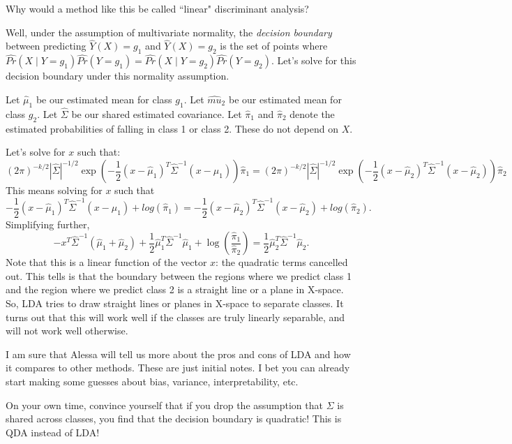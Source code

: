 Why would a method like this be called ``linear" discriminant analysis? 

Well, under the assumption of multivariate normality, the \emph{decision boundary} between predicting $\hat{Y}(X) = g_1$ and $\hat{Y}(X) = g_2$ is the set of points where  $\widehat{Pr}(X \mid Y=g_1)\widehat{Pr}(Y=g_1)=\widehat{Pr}(X \mid Y=g_2)\widehat{Pr}(Y=g_2)$. Let's solve for this decision boundary under this normality assumption. 

Let $\hat{\mu}_1$ be our estimated mean for class $g_1$. Let $\hat{mu}_2$ be our estimated mean for class $g_2$. Let $\hat{\Sigma}$ be our shared estimated covariance. Let $\hat{\pi}_1$ and $\hat{\pi}_2$ denote the estimated probabilities of falling in class 1 or class 2. These do not depend on $X$. 

 Let's solve for $x$ such that:
$$
(2\pi)^{-k/2}|\hat{\Sigma}|^{-1/2} \exp\left( -\frac{1}{2} (x - \hat{\mu}_1)^T  \hat{\Sigma}^{-1}(x - \hat{\mu}_1)\right) \hat{\pi}_1= (2\pi)^{-k/2}|\hat{\Sigma}|^{-1/2} \exp\left( -\frac{1}{2} (x - \hat{\mu}_2)^T  \hat{\Sigma}^{-1}(x - \hat{\mu}_2)\right) \hat{\pi}_2
$$ 
This means solving for $x$ such that 
$$
-\frac{1}{2} (x - \hat{\mu}_1)^T  \hat{\Sigma}^{-1}(x - \hat{\mu}_1) + log(\hat{\pi}_1)= -\frac{1}{2} (x - \hat{\mu}_2)^T  \hat{\Sigma}^{-1}(x - \hat{\mu}_2) +  log(\hat{\pi}_2).
$$ 
Simplifying further,
$$
- x^T \hat{\Sigma}^{-1} (\hat{\mu}_1+\hat{\mu}_2) + \frac{1}{2} \hat{\mu}_1 ^T \hat{\Sigma}^{-1} \hat{\mu}_1 + \log(\frac{\hat{\pi}_1}{\hat{\pi}_2}) =   \frac{1}{2} \hat{\mu}_2 ^T \hat{\Sigma}^{-1} \hat{\mu}_2. 
$$ 
Note that this is a linear function of the vector $x$: the quadratic terms cancelled out. This tells is that the boundary between the regions where we predict class 1 and the region where we predict class 2 is a straight line or a plane in X-space. So, LDA tries to draw straight lines or planes in X-space to separate classes. It turns out that this will work well if the classes are truly linearly separable, and will not work well otherwise.

I am sure that Alessa will tell us more about the pros and cons of LDA and how it compares to other methods.  These are just initial notes. I bet you can already start making some guesses about bias, variance, interpretability, etc. 

On your own time, convince yourself that if you drop the assumption that $\Sigma$ is shared across classes, you find that the decision boundary is quadratic! This is QDA instead of LDA! 



